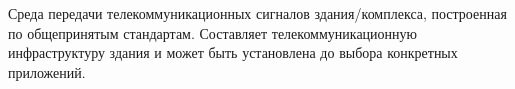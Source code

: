 Среда передачи телекоммуникационных сигналов 
здания/комплекса, построенная по общепринятым стандартам.
Составляет телекоммуникационную инфраструктуру здания и может
быть установлена до выбора конкретных приложений.